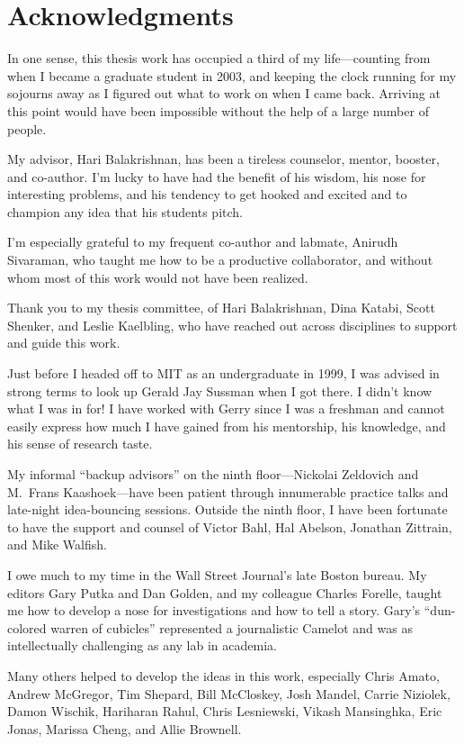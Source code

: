\chapter*{Acknowledgments}
%

In one sense, this thesis work has occupied a third of my
life---counting from when I became a graduate student in 2003, and
keeping the clock running for my sojourns away as I figured out what
to work on when I came back. Arriving at this point would have been
impossible without the help of a large number of people.

My advisor, Hari Balakrishnan, has been a tireless counselor, mentor,
booster, and co-author. I'm lucky to have had the benefit of his
wisdom, his nose for interesting problems, and his tendency to get
hooked and excited and to champion any idea that his students pitch.

I'm especially grateful to my frequent co-author and labmate, Anirudh
Sivaraman, who taught me how to be a productive collaborator, and
without whom most of this work would not have been realized.

Thank you to my thesis committee, of Hari Balakrishnan, Dina Katabi,
Scott Shenker, and Leslie Kaelbling, who have reached out across
disciplines to support and guide this work.

Just before I headed off to MIT as an undergraduate in 1999, I was
advised in strong terms to look up Gerald Jay Sussman when I got
there. I didn't know what I was in for! I have worked with Gerry since
I was a freshman and cannot easily express how much I have gained from
his mentorship, his knowledge, and his sense of research taste.

My informal ``backup advisors'' on the ninth floor---Nickolai
Zeldovich and M.~Frans Kaashoek---have been patient through
innumerable practice talks and late-night idea-bouncing
sessions. Outside the ninth floor, I have been fortunate to have the
support and counsel of Victor Bahl, Hal Abelson, Jonathan Zittrain,
and Mike Walfish.

I owe much to my time in the Wall Street Journal's late Boston
bureau. My editors Gary Putka and Dan Golden, and my colleague Charles
Forelle, taught me how to develop a nose for investigations and how to
tell a story. Gary's ``dun-colored warren of cubicles'' represented a
journalistic Camelot and was as intellectually challenging as any lab
in academia.

Many others helped to develop the ideas in this work, especially Chris
Amato, Andrew McGregor, Tim Shepard, Bill McCloskey, Josh Mandel,
Carrie Niziolek, Damon Wischik, Hariharan Rahul, Chris Lesniewski,
Vikash Mansinghka, Eric Jonas, Marissa Cheng, and Allie Brownell.

